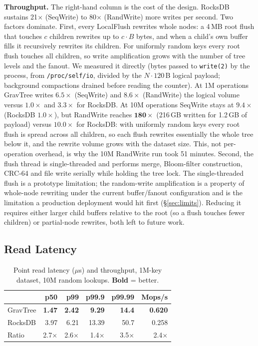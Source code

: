\documentclass[10pt,twocolumn]{article}
\begin{document}
\textbf{Throughput.}  The right-hand column is the cost of the design.
RocksDB sustains 21$\times$ (SeqWrite) to 80$\times$ (RandWrite) more writes
per second.  Two factors dominate.  First, every LocalFlush rewrites whole
nodes: a 4\,MB root flush that touches $c$ children rewrites up to
$c \cdot B$ bytes, and when a child's own buffer fills it recursively rewrites
its children.  For uniformly random keys every root flush touches all
children, so write amplification grows with the number of tree levels and
the fanout.  We measured it directly (bytes passed to \texttt{write(2)} by
the process, from \texttt{/proc/self/io}, divided by the $N \cdot 120$\,B
logical payload; background compactions drained before reading the
counter).  At 1M operations GravTree writes $6.5\times$ (SeqWrite) and
$8.6\times$ (RandWrite) the logical volume versus $1.0\times$ and
$3.3\times$ for RocksDB.  At 10M operations SeqWrite stays at $9.4\times$
(RocksDB $1.0\times$), but RandWrite reaches $\mathbf{180\times}$
(216\,GB written for 1.2\,GB of payload) versus $10.0\times$ for RocksDB:
with uniformly random keys every root flush is spread across all children,
so each flush rewrites essentially the whole tree below it, and the rewrite
volume grows with the dataset size.  This, not per-operation
overhead, is why the 10M RandWrite run took 51 minutes.  Second, the flush thread is single-threaded and performs merge,
Bloom-filter construction, CRC-64 and file write serially while holding the
tree lock.  The single-threaded flush is a prototype limitation; the random-write
amplification is a property of whole-node rewriting under the current
buffer/fanout configuration and is the limitation a production deployment
would hit first (\S\ref{sec:limits}).  Reducing it requires either
larger child buffers relative to the root (so a flush touches fewer
children) or partial-node rewrites, both left to future work.

\subsection{Read Latency}

\begin{table}[t]
\centering
\small
\caption{Point read latency ($\mu$s) and throughput, 1M-key dataset,
10M random lookups.  \textbf{Bold} = better.}
\label{tab:read}
\begin{tabular}{lrrrrr}
\toprule
 & p50 & p99 & p99.9 & p99.99 & Mops/s \\
\midrule
GravTree & \textbf{1.47} & \textbf{2.42} & \textbf{9.29} & \textbf{14.4} & \textbf{0.620} \\
RocksDB  & 3.97 & 6.21 & 13.39 & 50.7 & 0.258 \\
Ratio    & 2.7$\times$ & 2.6$\times$ & 1.4$\times$ & 3.5$\times$ & 2.4$\times$ \\
\bottomrule
\end{tabular}
\end{table}
\end{document}
